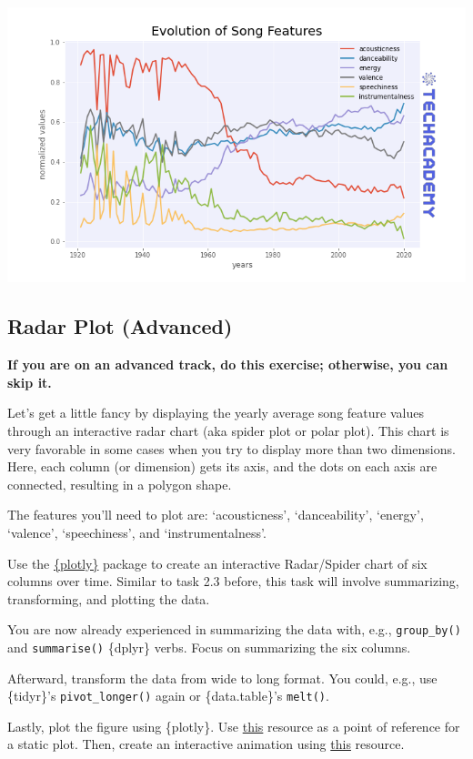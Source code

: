 \documentclass[
  11pt,
]{book}
\newenvironment{tips}[1]
  {
  \begin{itemize}
  \footnotesize
  \renewcommand{\labelitemi}{
    \raisebox{-.7\height}[0pt][0pt]{
      {\setkeys{Gin}{width=3em,keepaspectratio}
        \texttt{[image: images/\#1.png]}}
    }
  }
  \setlength{\fboxsep}{1em}
  \begin{rbox}
  \item
  }
  {
  \end{rbox}
  \end{itemize}
  }
\begin{document}
\begin{center}\includegraphics[width=1\linewidth]{splots/features_over_time} \end{center}

\hypertarget{radar-plot-advanced}{%
\subsection{Radar Plot (Advanced)}\label{radar-plot-advanced}}

\textbf{If you are on an advanced track, do this exercise; otherwise, you can skip it.}

Let's get a little fancy by displaying the yearly average song feature values through an interactive radar chart (aka spider plot or polar plot). This chart is very favorable in some cases when you try to display more than two dimensions. Here, each column (or dimension) gets its axis, and the dots on each axis are connected, resulting in a polygon shape.

The features you'll need to plot are: `acousticness', `danceability', `energy', `valence', `speechiness', and `instrumentalness'.

\begin{tips}r

Use the \href{https://plotly.com/r/getting-started/}{\{plotly\}} package to create an interactive Radar/Spider chart of six columns over time. Similar to task 2.3 before, this task will involve summarizing, transforming, and plotting the data.

You are now already experienced in summarizing the data with, e.g., \texttt{group\_by()} and \texttt{summarise()} \{dplyr\} verbs. Focus on summarizing the six columns.

Afterward, transform the data from wide to long format. You could, e.g., use \{tidyr\}'s \texttt{pivot\_longer()} again or \{data.table\}'s \texttt{melt()}.

Lastly, plot the figure using \{plotly\}. Use \href{https://plotly.com/r/radar-chart/}{this} resource as a point of reference for a static plot. Then, create an interactive animation using \href{https://plotly.com/r/animations/}{this} resource.

\end{tips}
\end{document}
